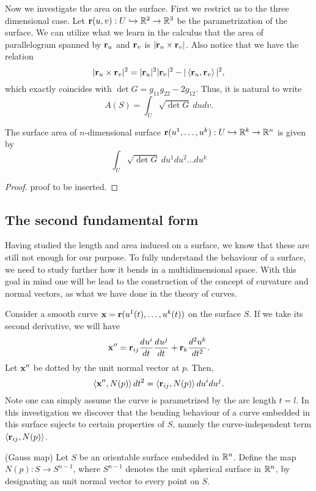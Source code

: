 Now we investigate the area on the surface. First we restrict us to the three dimensional case. Let $\mathbf{r}(u, v): U \hookrightarrow \mathbb{R}^2 \rightarrow \mathbb{R}^3$ be the parametrization of the surface. We can utilize what we learn in the calculus that the area of parallelogram spanned by $\mathbf{r}_u$ and $\mathbf{r}_v$ is $|\mathbf{r}_u \times \mathbf{r}_v|$. Also notice that we have the relation \[ |\mathbf{r}_u \times \mathbf{r}_v|^2 = |\mathbf{r}_u|^2|\mathbf{r}_v|^2 - |\left< \mathbf{r}_u, \mathbf{r}_v \right>|^2, \] which exactly coincides with $\det G = g_{11}g_{22} - 2g_{12}$. Thus, it is natural to write
\[ A(S) = \int_{U} \sqrt{\det G} ~ dudv. \]

\begin{theorem}
	The surface area of $n$-dimensional surface $\mathbf{r}(u^1, \dots, u^k): U \hookrightarrow \mathbb{R}^k \rightarrow \mathbb{R}^n$ is given by
	\begin{equation}
		\int_{U} \sqrt{\det G} ~ du^1 du^2 \dots du^k
	\end{equation}
	\label{eq:area}
\end{theorem}
\begin{proof}
	proof to be inserted.
\end{proof}

\subsection{The second fundamental form}
Having studied the length and area induced on a surface, we know that these are still not enough for our purpose. To fully understand the behaviour of a surface, we need to study further how it bends in a multidimensional space. With this goal in mind one will be lead to the construction of the concept of curvature and normal vectors, as what we have done in the theory of curves. 

Consider a smooth curve $\mathbf{x} = \mathbf{r}(u^1(t), \dots, u^k(t))$ on the surface $S$. If we take its second derivative, we will have \[\mathbf{x}'' = \mathbf{r}_{ij}\frac{d^{} u^i}{d t^{}} \frac{d^{} u^j}{d t^{}} + \mathbf{r}_k \frac{d^2 u^k}{dt^2}.\] Let $\mathbf{x}''$ be dotted by the unit normal vector at $p$. Then, \[\left< \mathbf{x}'', N(p) \right> dt^2 = \left< \mathbf{r}_{ij}, N(p) \right>du^idu^j.\] Note one can simply assume the curve is parametrized by the arc length $t = l$. In this investigation we discover that the bending behaviour of a curve embedded in this surface sujects to certain properties of $S$, namely the curve-independent term $\left< \mathbf{r}_{ij}, N(p) \right>$.

\begin{definition}
	(Gauss map) Let $S$ be an orientable surface embedded in $\mathbb{R}^n$. Define the map $N(p): S \rightarrow S^{n-1}$, where $S^{n-1}$ denotes the unit spherical surface in $\mathbb{R}^n$, by designating an unit normal vector to every point on $S$.
\end{definition}

